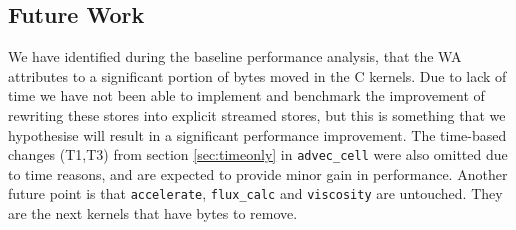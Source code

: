 \documentclass[a4paper,11pt]{article}
\newcommand{\kernel}[1]{\texttt{#1}}
\begin{document}
\subsection{Future Work}
\label{sec:future}

We have identified during the baseline performance analysis, that the WA attributes to a significant portion of bytes moved in the C kernels. Due to lack of time we have not been able to implement and benchmark the improvement of rewriting these stores into explicit streamed stores, but this is something that we hypothesise will result in a significant performance improvement. The time-based changes (T1,T3) from section \ref{sec:timeonly} in \texttt{advec\_cell} were also omitted due to time reasons, and are expected to provide minor gain in performance. Another future point is that \kernel{accelerate}, \kernel{flux\_calc} and \kernel{viscosity} are untouched. They are the next kernels that have bytes to remove.



\end{document}
